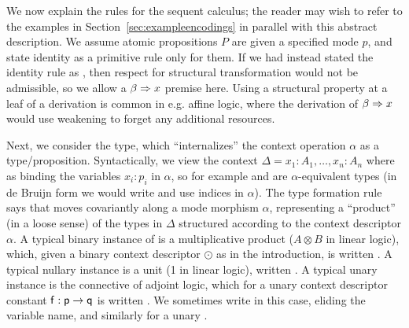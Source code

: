 
We now explain the rules for the sequent calculus; the reader may wish
to refer to the examples in Section~\ref{sec:exampleencodings} in
parallel with this abstract description.  We assume atomic propositions
$P$ are given a specified mode $p$, and state identity as a primitive
rule only for them.  If we had instead stated the identity rule as
, then respect for structural transformation would
not be admissible, so we allow a $\beta \Rightarrow x$ premise here.  Using a
structural property at a leaf of a derivation is common in e.g. affine
logic, where the derivation of $\beta \Rightarrow x$ would use weakening to
forget any additional resources.

Next, we consider the \F{\alpha}{\Delta} type, which ``internalizes''
the context operation $\alpha$ as a type/proposition.  Syntactically, we
view the context $\Delta = x_1:A_1,\ldots,x_n:A_n$ where
 as binding the variables $x_i:p_i$ in $\alpha$, so for
example  and  are $\alpha$-equivalent types (in de Bruijn form we
would write  and use indices in $\alpha$).
The type formation rule says that  moves covariantly along a mode
morphism $\alpha$, representing a ``product'' (in a loose sense) of the
types in $\Delta$ structured according to the context descriptor
$\alpha$. A typical binary instance of  is a multiplicative
product ($A \otimes B$ in linear logic), which, given a binary context
descriptor $\odot$ as in the introduction, is written .  A typical nullary instance is a unit (1 in linear
logic), written .  A typical unary instance is the 
connective of adjoint logic, which for a unary context descriptor
constant $\mathsf{f} : \mathsf{p} \to \mathsf{q}$ is written .
We sometimes write  in this case, eliding the variable
name, and similarly for a unary .


